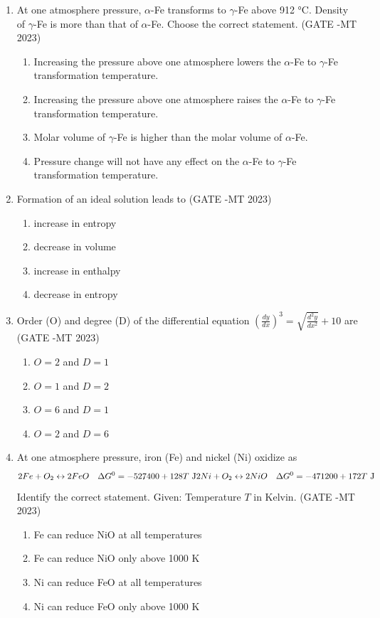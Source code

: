 \documentclass[12pt]{article}
\begin{document}
\begin{enumerate}
\item At one atmosphere pressure, \(\alpha\)-Fe transforms to \(\gamma\)-Fe above 912 °C. Density of \(\gamma\)-Fe is more than that of \(\alpha\)-Fe. Choose the correct statement.  (GATE -MT 2023)
\begin{enumerate}[label=(\alph*)]
  \item Increasing the pressure above one atmosphere lowers the \(\alpha\)-Fe to \(\gamma\)-Fe transformation temperature.
  \item Increasing the pressure above one atmosphere raises the \(\alpha\)-Fe to \(\gamma\)-Fe transformation temperature.
  \item Molar volume of \(\gamma\)-Fe is higher than the molar volume of \(\alpha\)-Fe.
  \item Pressure change will not have any effect on the \(\alpha\)-Fe to \(\gamma\)-Fe transformation temperature.
\end{enumerate}

\item Formation of an ideal solution leads to  (GATE -MT 2023)
\begin{enumerate}[label=(\alph*)]
  \item increase in entropy
  \item decrease in volume
  \item increase in enthalpy
  \item decrease in entropy
\end{enumerate}

\item Order (O) and degree (D) of the differential equation \(\left(\frac{dy}{dx}\right)^3 = \sqrt{\frac{d^2y}{dx^2}} + 10\) are  (GATE -MT 2023)
\begin{enumerate}[label=(\alph*)]
  \item \(O = 2\) and \(D=1\)
  \item \(O = 1\) and \(D=2\)
  \item \(O = 6\) and \(D=1\)
  \item \(O = 2\) and \(D=6\)
\end{enumerate}

\item At one atmosphere pressure, iron (Fe) and nickel (Ni) oxidize as  
\[
2Fe + O_2 \leftrightarrow 2FeO \quad \Delta G^0 = -527400 + 128 T \text{ J} \\
2Ni + O_2 \leftrightarrow 2NiO \quad \Delta G^0 = -471200 + 172 T \text{ J}
\]
Identify the correct statement. Given: Temperature \(T\) in Kelvin. (GATE -MT 2023)
\begin{enumerate}[label=(\alph*)]
  \item Fe can reduce NiO at all temperatures
  \item Fe can reduce NiO only above 1000 K
  \item Ni can reduce FeO at all temperatures
  \item Ni can reduce FeO only above 1000 K
\end{enumerate}


\end{enumerate}
\end{document}
